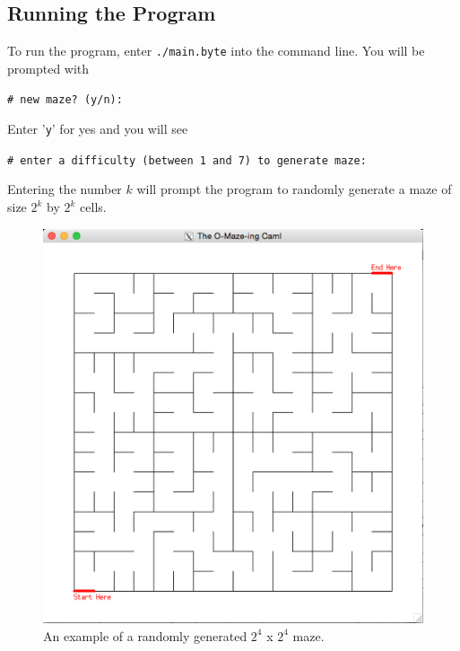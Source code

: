 \documentclass[11pt, margin=1in]{article}
\begin{document}
\subsection{Running the Program} %
To run the program, enter \texttt{./main.byte} into the command line.  You will be prompted with

\begin{flushleft}
\quad \quad \texttt{\# new maze? (y/n): } 
\end{flushleft}

Enter '\texttt{y}' for yes and you will see

\begin{flushleft}
\quad \quad \texttt{\# enter a difficulty (between 1 and 7) to generate maze:}
\end{flushleft}


Entering the number $k$ will prompt the program to randomly generate a maze of size $2^k$ by $2^k$ cells.  

\begin{figure}[H]
\begin{center}
\includegraphics[scale=0.32]{example.jpg}
\caption{An example of a randomly generated $2^4$ x $2^4$ maze.}
\end{center}
\end{figure}
\end{document}
